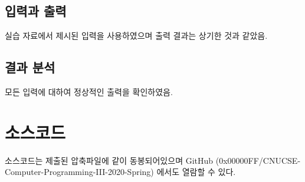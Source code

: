 \documentclass[UTF8]{report}
\begin{document}
        \newpage

        \section{입력과 출력}
            실습 자료에서 제시된 입력을 사용하였으며 출력 결과는 상기한 것과 같았음.
        \section{결과 분석}
            모든 입력에 대하여 정상적인 출력을 확인하였음.

    \chapter{소스코드}
        소스코드는 제출된 압축파일에 같이 동봉되어있으며 GitHub (0x00000FF/CNUCSE-Computer-Programming-III-2020-Spring) 에서도 열람할 수 있다.
\end{document}
